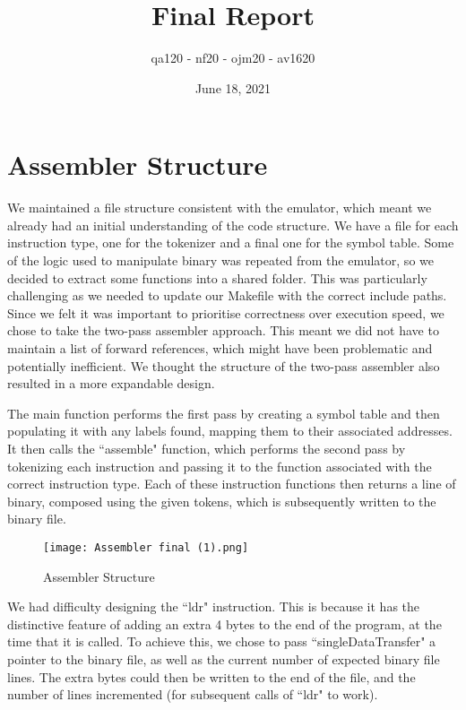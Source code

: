 \documentclass[]{article}
\begin{document}
\title{Final Report}
\date{June 18, 2021}
\author{qa120 - nf20 - ojm20 - av1620}

\maketitle


\section*{Assembler Structure}

We maintained a file structure consistent with the emulator, which meant we already had an initial understanding of the code structure. We have a file for each instruction type, one for the tokenizer and a final one for the symbol table. Some of the logic used to manipulate binary was repeated from the emulator, so we decided to extract some functions into a shared folder. This was particularly challenging as we needed to update our Makefile with the correct include paths. Since we felt it was important to prioritise correctness over execution speed, we chose to take the two-pass assembler approach. This meant we did not have to maintain a list of forward references, which might have been problematic and potentially inefficient. We thought the structure of the two-pass assembler also resulted in a more expandable design.

\vspace{5mm}

The main function performs the first pass by creating a symbol table and then populating it with any labels found, mapping them to their associated addresses. It then calls the ``assemble" function, which performs the second pass by tokenizing each instruction and passing it to the function associated with the correct instruction type. Each of these instruction functions then returns a line of binary, composed using the given tokens, which is subsequently written to the binary file.

\vspace{5mm}

\begin{wrapfigure}{L}{0.37\textwidth}
\centering
    \centering
    \vspace{-3mm}
    \texttt{[image: Assembler final (1).png]}
    \caption{\label{fig1 :}Assembler Structure}
\vspace{-5mm}
\end{wrapfigure}

We had difficulty designing the ``ldr" instruction. This is because it has the distinctive feature of adding an extra 4 bytes to the end of the program, at the time that it is called. To achieve this, we chose to pass ``singleDataTransfer" a pointer to the binary file, as well as the current number of expected binary file lines. The extra bytes could then be written to the end of the file, and the number of lines incremented (for subsequent calls of ``ldr" to work). 
\end{document}
